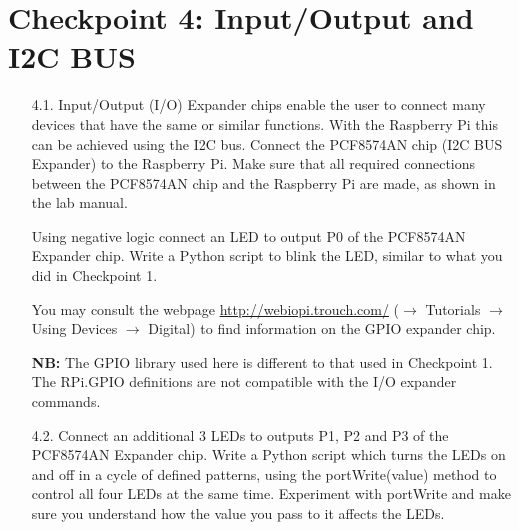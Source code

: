 \newpage
\section{Checkpoint 4: Input/Output and I2C BUS}

\begin{enumerate}


\item [4.1.] Input/Output (I/O) Expander chips enable the user to connect many devices that have the same or similar functions.
With the Raspberry Pi this can be achieved using the I2C bus.
Connect the PCF8574AN chip  (I2C BUS Expander) to the Raspberry Pi.
Make sure that all required connections between the PCF8574AN chip and the Raspberry Pi are made, as shown in the lab manual.

Using negative logic connect an LED to output P0 of the PCF8574AN Expander chip. 
Write a Python script to blink the LED, similar to what you did in Checkpoint 1.

You may consult the \webiopi webpage \url{http://webiopi.trouch.com/} ($\rightarrow$ Tutorials $\rightarrow$ Using Devices $\rightarrow$ Digital) to find information on the GPIO expander chip.

{\bf NB:} The GPIO library used here is different to that used in Checkpoint 1.
The RPi.GPIO definitions are not compatible with the \webiopi I/O expander commands. \\



\item [4.2.] Connect an additional 3 LEDs to outputs P1, P2 and P3 of the PCF8574AN Expander chip.
Write a Python script which turns the LEDs on and off in a cycle of defined patterns, using the portWrite(value) method to control all four LEDs at the same time.
Experiment with portWrite and make sure you understand how the value you pass to it affects the LEDs.


%

\end{enumerate}

